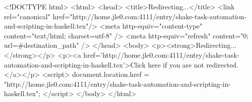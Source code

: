 <!DOCTYPE html>
<html>
<head>
<title>Redirecting...</title>
<link rel="canonical" href="http://home.jle0.com:4111/entry/shake-task-automation-and-scripting-in-haskell.tex"/>
<meta http-equiv="content-type" content="text/html; charset=utf-8" />
<meta http-equiv="refresh" content="0; url=#{destination_path}" />
</head>
<body>
  <p><strong>Redirecting...</strong></p>
  <p><a href='http://home.jle0.com:4111/entry/shake-task-automation-and-scripting-in-haskell.tex'>Click here if you are not redirected.</a></p>
  <script>
    document.location.href = "http://home.jle0.com:4111/entry/shake-task-automation-and-scripting-in-haskell.tex";
  </script>
</body>
</html>
